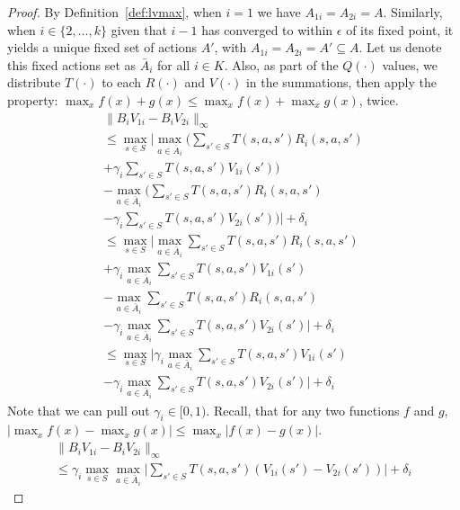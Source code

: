\begin{proof}
By Definition~\ref{def:lvmax}, when $i=1$ we have $A_{1i} = A_{2i} = A$. Similarly, when $i \in \{2, \ldots, k\}$ given that $i-1$ has converged to within $\epsilon$ of its fixed point, it yields a unique fixed set of actions $A'$, with $A_{1i} = A_{2i} = A' \subseteq A$. Let us denote this fixed actions set as $\bar{A}_i$ for all $i \in K$. Also, as part of the $Q(\cdot)$ values, we distribute $T(\cdot)$ to each $R(\cdot)$ and $V(\cdot)$ in the summations, then apply the property: $\max_x f(x) + g(x) \leq \max_x f(x) + \max_x g(x)$, twice.
\begin{multline*}
    \| B_i V_{1i} - B_i V_{2i} \|_\infty \\
    \leq \max_{s \in S} \Big| \max_{a \in \bar{A}_i} \Big( \sum_{s' \in S} T(s, a, s') R_i(s, a, s') \\
    + \gamma_i \sum_{s' \in S} T(s, a, s') V_{1i}(s') \Big) \\
    - \max_{a \in \bar{A}_i} \Big( \sum_{s' \in S} T(s, a, s') R_i(s, a, s') \\
    - \gamma_i \sum_{s' \in S} T(s, a, s') V_{2i}(s') \Big) \Big| + \delta_i \\
    \leq \max_{s \in S} \Big| \max_{a \in \bar{A}_i} \sum_{s' \in S} T(s, a, s') R_i(s, a, s') \\
    + \gamma_i \max_{a \in \bar{A}_i} \sum_{s' \in S} T(s, a, s') V_{1i}(s') \\
    - \max_{a \in \bar{A}_i} \sum_{s' \in S} T(s, a, s') R_i(s, a, s') \\
    - \gamma_i \max_{a \in \bar{A}_i} \sum_{s' \in S} T(s, a, s') V_{2i}(s') \Big| + \delta_i \\
    \leq \max_{s \in S} \Big| \gamma_i \max_{a \in \bar{A}_i} \sum_{s' \in S} T(s, a, s') V_{1i}(s') \\
    - \gamma_i \max_{a \in \bar{A}_i} \sum_{s' \in S} T(s, a, s') V_{2i}(s') \Big| + \delta_i
\end{multline*}
Note that we can pull out $\gamma_i \in [0, 1)$. Recall, that for any two functions $f$ and $g$, $| \max_x f(x) - \max_x g(x) | \leq \max_x | f(x) - g(x) |$.
\begin{multline*}
    \| B_i V_{1i} - B_i V_{2i} \|_\infty \\
    \leq \gamma_i \max_{s \in S} \max_{a \in \bar{A}_i} \Big| \sum_{s' \in S} T(s, a, s') (V_{1i}(s') - V_{2i}(s')) \Big| + \delta_i
\end{multline*}


\end{proof}
